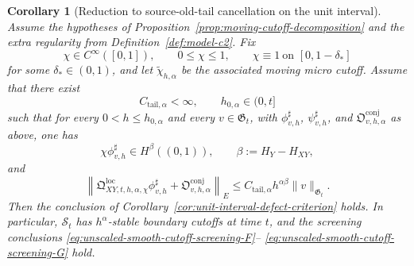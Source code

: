 \documentclass[11pt,a4paper]{amsart}
\theoremstyle{plain}
\newtheorem{corollary}[theorem]{Corollary}
\theoremstyle{definition}
\theoremstyle{remark}
\begin{document}
\begin{corollary}[Reduction to source-old-tail cancellation on the unit interval]
\label{cor:unit-interval-source-tail}
Assume the hypotheses of Proposition~\ref{prop:moving-cutoff-decomposition} and the extra regularity
from Definition~\ref{def:model-c2}. Fix
\[
\chi\in C^\infty([0,1]),
\qquad
0\le \chi\le1,
\qquad
\chi\equiv1\ \text{on }[0,1-\delta_*]
\]
for some \(\delta_*\in(0,1)\), and let \(\widetilde\chi_{h,\alpha}\) be the associated moving micro
cutoff. Assume that there exist
\[
C_{\mathrm{tail},\alpha}<\infty,
\qquad
h_{0,\alpha}\in(0,t]
\]
such that for every \(0<h\le h_{0,\alpha}\) and every \(v\in\mathfrak G_t\), with
\(\phi_{v,h}^{\sharp}\), \(\psi_{v,h}^{\sharp}\), and \(\mathfrak O_{v,h,\alpha}^{\mathrm{conj}}\)
as above, one has
\[
\chi\phi_{v,h}^{\sharp}\in H^\beta((0,1)),
\qquad
\beta:=H_Y-H_{XY},
\]
and
\begin{equation}\label{eq:unit-interval-source-tail}
\left\|
\mathfrak Q_{XY,t,h,\alpha,\chi}^{\mathrm{loc}}\phi_{v,h}^{\sharp}
+
\mathfrak O_{v,h,\alpha}^{\mathrm{conj}}
\right\|_{E}
\le
C_{\mathrm{tail},\alpha}h^{\alpha\beta}\|v\|_{\mathfrak G_t}.
\end{equation}
Then the conclusion of Corollary~\ref{cor:unit-interval-defect-criterion} holds. In particular,
\(\mathcal S_t\) has \(h^\alpha\)-stable boundary cutoffs at time \(t\), and the screening
conclusions \eqref{eq:unscaled-smooth-cutoff-screening-F}--
\eqref{eq:unscaled-smooth-cutoff-screening-G} hold.
\end{corollary}
\end{document}

